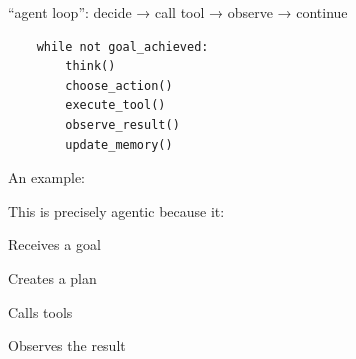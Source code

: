 \documentclass[a4paper]{article}
\title{}
\date{}
\begin{document}
    \maketitle
    “agent loop”: decide → call tool → observe → continue
    \begin{verbatim}
    while not goal_achieved:
        think()
        choose_action()
        execute_tool()
        observe_result()
        update_memory()
    \end{verbatim}
    An example:
    
    This is precisely agentic because it:
    
    Receives a goal
    
    Creates a plan
    
    Calls tools
    
    Observes the result
    
\end{document}
